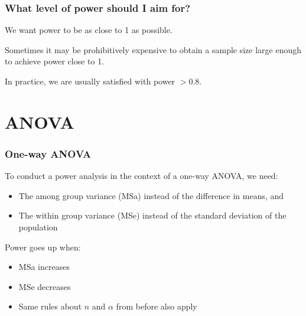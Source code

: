 \documentclass[color=usenames,dvipsnames]{beamer}\usepackage[]{graphicx}\usepackage[]{color}
\begin{document}
\begin{frame}
  \frametitle{What level of power should I aim for?}
  \large
  {%
    We want power to be as close to 1 as possible.} \par
  \pause
  \vfill %
  {%
    Sometimes it may be prohibitively expensive to obtain a sample
    size large enough to achieve power close to 1.} \par
  \pause
  \vfill %
  {%
    In practice, we are usually satisfied with power $>$0.8. }
\end{frame}




\section{ANOVA}


\begin{frame}
  \frametitle{One-way ANOVA}
  {%
    To conduct a power analysis in the context of a one-way ANOVA,
    we need:}
  \begin{itemize}
    \item The among group variance (MSa) instead of the difference in means, and
    \item The within group variance (MSe) instead of the standard deviation
      of the population
  \end{itemize}
  \pause
  \vfill
  {%
    Power goes up when:}
  \begin{itemize}
    \item MSa increases
    \item MSe decreases
    \item Same rules about $n$ and $\alpha$ from before also apply
  \end{itemize}
\end{frame}
\end{document}
